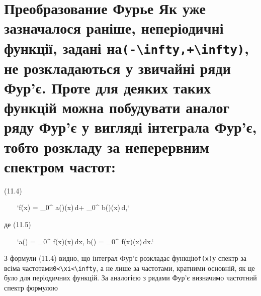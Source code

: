 \documentclass[
  ukrainian,
]{article}
\begin{document}
\section{\texorpdfstring{Преобразование Фурье Як уже зазначалося раніше,
неперіодичні функції, задані
на\texttt{(-\textbackslash{}infty,+\textbackslash{}infty)}, не
розкладаються у звичайні ряди Фур'є. Проте для деяких таких функцій
можна побудувати аналог ряду Фур'є у вигляді інтеграла Фур'є, тобто
розкладу за неперервним спектром
частот:}{Преобразование Фурье Як уже зазначалося раніше, неперіодичні функції, задані на(-\textbackslash infty,+\textbackslash infty), не розкладаються у звичайні ряди Фур'є. Проте для деяких таких функцій можна побудувати аналог ряду Фур'є у вигляді інтеграла Фур'є, тобто розкладу за неперервним спектром частот:}}\label{ux43fux440ux435ux43eux431ux440ux430ux437ux43eux432ux430ux43dux438ux435-ux444ux443ux440ux44cux435-ux44fux43a-ux443ux436ux435-ux437ux430ux437ux43dux430ux447ux430ux43bux43eux441ux44f-ux440ux430ux43dux456ux448ux435-ux43dux435ux43fux435ux440ux456ux43eux434ux438ux447ux43dux456-ux444ux443ux43dux43aux446ux456ux457-ux437ux430ux434ux430ux43dux456-ux43dux430-inftyinfty-ux43dux435-ux440ux43eux437ux43aux43bux430ux434ux430ux44eux442ux44cux441ux44f-ux443-ux437ux432ux438ux447ux430ux439ux43dux456-ux440ux44fux434ux438-ux444ux443ux440ux454.-ux43fux440ux43eux442ux435-ux434ux43bux44f-ux434ux435ux44fux43aux438ux445-ux442ux430ux43aux438ux445-ux444ux443ux43dux43aux446ux456ux439-ux43cux43eux436ux43dux430-ux43fux43eux431ux443ux434ux443ux432ux430ux442ux438-ux430ux43dux430ux43bux43eux433-ux440ux44fux434ux443-ux444ux443ux440ux454-ux443-ux432ux438ux433ux43bux44fux434ux456-ux456ux43dux442ux435ux433ux440ux430ux43bux430-ux444ux443ux440ux454-ux442ux43eux431ux442ux43e-ux440ux43eux437ux43aux43bux430ux434ux443-ux437ux430-ux43dux435ux43fux435ux440ux435ux440ux432ux43dux438ux43c-ux441ux43fux435ux43aux442ux440ux43eux43c-ux447ux430ux441ux442ux43eux442}

(11.4)

~~~
`f(x) = \int_{0}^{\infty} a(\xi)\cos(\xi x)\,d\xi + \int_{0}^{\infty} b(\xi)\sin(\xi x)\,d\xi,`
~~~

де (11.5)

~~~
`a(\xi) = \int_{0}^{\infty} f(x)\cos(\xi x)\,dx, \qquad b(\xi) = \int_{0}^{\infty} f(x)\sin(\xi x)\,dx.`
~~~

З формули (11.4) видно, що інтеграл Фур'є розкладає
функцію\texttt{f(x)}у спектр за всіма
частотами\texttt{0\textless{}\textbackslash{}xi\textless{}\textbackslash{}infty},
а не лише за частотами, кратними основній, як це було для періодичних
функцій. За аналогією з рядами Фур'є визначимо частотний спектр формулою
\end{document}
